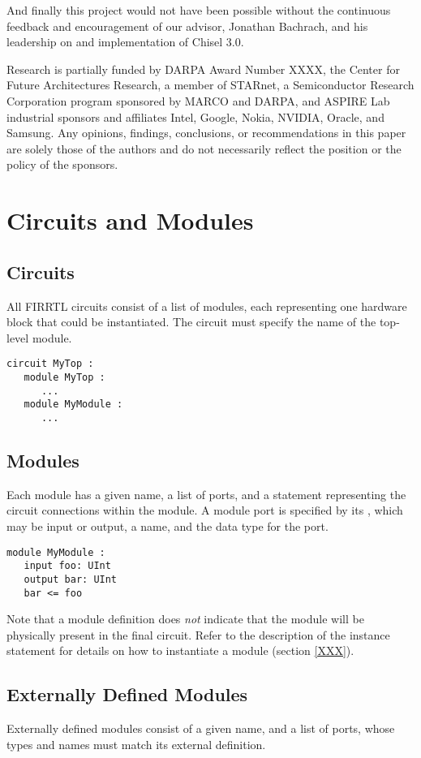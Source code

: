 \documentclass[12pt]{article}
\begin{document}
And finally this project would not have been possible without the continuous feedback and encouragement of our advisor, Jonathan Bachrach, and his leadership on and implementation of Chisel 3.0.

Research is partially funded by DARPA Award Number XXXX, the Center for Future Architectures Research, a member of STARnet, a Semiconductor Research Corporation program sponsored by MARCO and DARPA, and ASPIRE Lab industrial sponsors and affiliates Intel, Google, Nokia, NVIDIA, Oracle, and Samsung. Any opinions, findings, conclusions, or recommendations in this paper are solely those of the authors and do not necessarily reflect the position or the policy of the sponsors.

\section{Circuits and Modules}

\subsection{Circuits}
All FIRRTL circuits consist of a list of modules, each representing one hardware block that could be instantiated. The circuit must specify the name of the top-level module.

\begin{verbatim}
circuit MyTop :
   module MyTop :
      ...
   module MyModule :
      ...   
\end{verbatim}   

\subsection{Modules}
Each module has a given name, a list of ports, and a statement representing the circuit connections within the module. A module port is specified by its , which may be input or output, a name, and the data type for the port. 

\begin{verbatim}
module MyModule :
   input foo: UInt
   output bar: UInt
   bar <= foo
\end{verbatim}  

Note that a module definition does {\em not} indicate that the module will be physically present in the final circuit. Refer to the description of the instance statement for details on how to instantiate a module (section \ref{XXX}).

\subsection{Externally Defined Modules}
Externally defined modules consist of a given name, and a list of ports, whose types and names must match its external definition.
\end{document}
